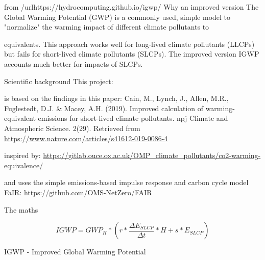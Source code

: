 \documentclass{tufte-handout}\usepackage[]{graphicx}\usepackage[]{xcolor}
\begin{document}
from /url{https://hydrocomputing.github.io/igwp/}
Why an improved version
The Global Warming Potential (GWP) is a commonly used, simple model to "normalize" the warming impact of different climate pollutants to 

  equivalents. This approach works well for long-lived climate pollutants (LLCPs) but fails for short-lived climate pollutants (SLCPs). The improved version IGWP accounts much better for impacts of SLCPs.

Scientific background
This project:

is based on the findings in this paper: Cain, M., Lynch, J., Allen, M.R., Fuglestedt, D.J. \& Macey, A.H. (2019). Improved calculation of warming- equivalent emissions for short-lived climate pollutants. npj Climate and Atmospheric Science. 2(29). Retrieved from \url{https://www.nature.com/articles/s41612-019-0086-4}

inspired by: \url{https://gitlab.ouce.ox.ac.uk/OMP_climate_pollutants/co2-warming-equivalence/}

and uses the simple emissions-based impulse response and carbon cycle model FaIR: https://github.com/OMS-NetZero/FAIR

The maths

\begin{equation}
IGWP = GWP_H * (r * \frac{\Delta E_{SLCP}}{\Delta t}*H + s * E_{SLCP})
\end{equation}


IGWP - Improved Global Warming Potential

	
\end{document}
